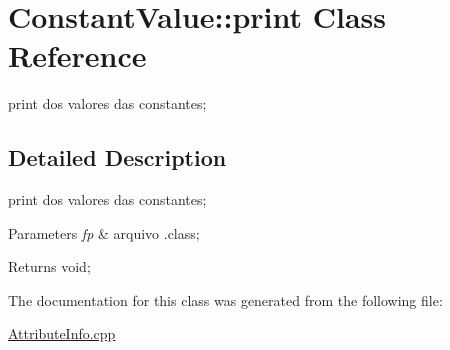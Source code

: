 \hypertarget{class_constant_value_1_1print}{}\section{Constant\+Value\+:\+:print Class Reference}
\label{class_constant_value_1_1print}


print dos valores das constantes;  




\subsection{Detailed Description}
print dos valores das constantes; 


\begin{DoxyParams}{Parameters}
{\em fp} & arquivo .class; \\
\hline
\end{DoxyParams}
\begin{DoxyReturn}{Returns}
void; 
\end{DoxyReturn}


The documentation for this class was generated from the following file\+:\begin{DoxyCompactItemize}
\item 
\hyperlink{_attribute_info_8cpp}{Attribute\+Info.\+cpp}\end{DoxyCompactItemize}

